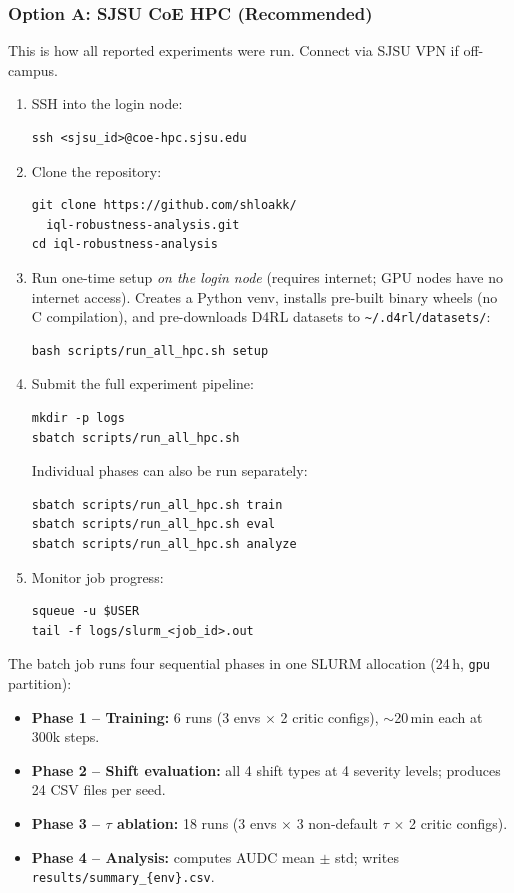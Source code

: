 \documentclass[conference]{IEEEtran}
\begin{document}
\subsubsection*{Option A: SJSU CoE HPC (Recommended)}

This is how all reported experiments were run. Connect via SJSU VPN if
off-campus.

\begin{enumerate}
  \item SSH into the login node:
\begin{verbatim}
ssh <sjsu_id>@coe-hpc.sjsu.edu
\end{verbatim}

  \item Clone the repository:
\begin{verbatim}
git clone https://github.com/shloakk/
  iql-robustness-analysis.git
cd iql-robustness-analysis
\end{verbatim}

  \item Run one-time setup \emph{on the login node} (requires internet;
        GPU nodes have no internet access). Creates a Python venv,
        installs pre-built binary wheels (no C compilation), and
        pre-downloads D4RL datasets to
        \texttt{\textasciitilde/.d4rl/datasets/}:
\begin{verbatim}
bash scripts/run_all_hpc.sh setup
\end{verbatim}

  \item Submit the full experiment pipeline:
\begin{verbatim}
mkdir -p logs
sbatch scripts/run_all_hpc.sh
\end{verbatim}

  Individual phases can also be run separately:
\begin{verbatim}
sbatch scripts/run_all_hpc.sh train
sbatch scripts/run_all_hpc.sh eval
sbatch scripts/run_all_hpc.sh analyze
\end{verbatim}

  \item Monitor job progress:
\begin{verbatim}
squeue -u $USER
tail -f logs/slurm_<job_id>.out
\end{verbatim}
\end{enumerate}

The batch job runs four sequential phases in one SLURM allocation
(24\,h, \texttt{gpu} partition):
\begin{itemize}
  \item \textbf{Phase 1 -- Training:} 6 runs (3 envs $\times$ 2
        critic configs), $\sim$20\,min each at 300k steps.
  \item \textbf{Phase 2 -- Shift evaluation:} all 4 shift types at
        4 severity levels; produces 24 CSV files per seed.
  \item \textbf{Phase 3 -- $\tau$ ablation:} 18 runs (3 envs
        $\times$ 3 non-default $\tau$ $\times$ 2 critic configs).
  \item \textbf{Phase 4 -- Analysis:} computes AUDC mean $\pm$ std;
        writes \texttt{results/summary\_\{env\}.csv}.
\end{itemize}
\end{document}

